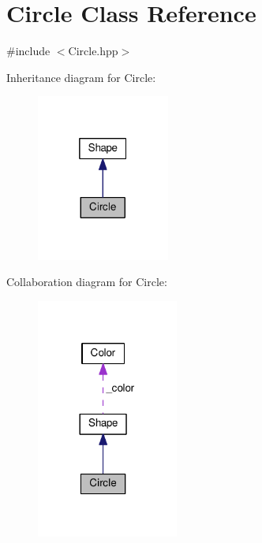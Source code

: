 \hypertarget{class_circle}{}\section{Circle Class Reference}
\label{class_circle}


{\ttfamily \#include $<$Circle.\+hpp$>$}



Inheritance diagram for Circle\+:\nopagebreak
\begin{figure}[H]
\begin{center}
\leavevmode
\includegraphics[width=124pt]{class_circle__inherit__graph}
\end{center}
\end{figure}


Collaboration diagram for Circle\+:\nopagebreak
\begin{figure}[H]
\begin{center}
\leavevmode
\includegraphics[width=132pt]{class_circle__coll__graph}
\end{center}
\end{figure}
